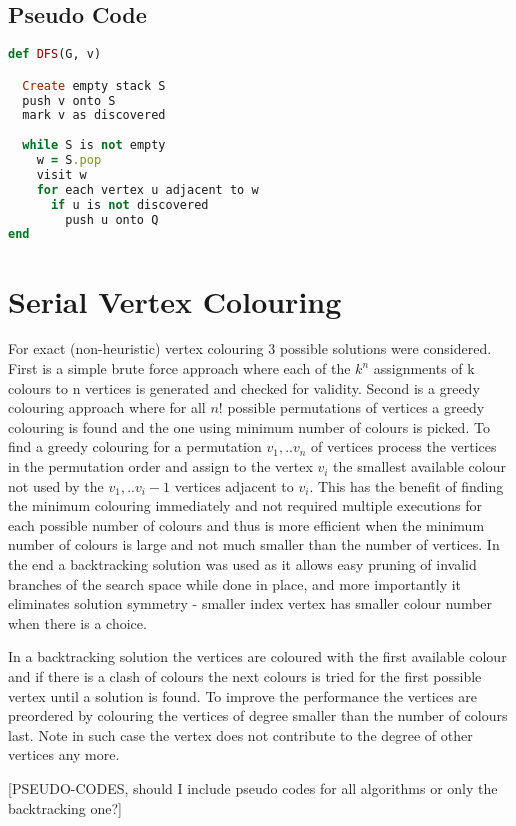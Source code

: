 \documentclass{report}
\theoremstyle{plain}
\theoremstyle{definition}
\theoremstyle{remark}
\begin{document}
\subsection*{Pseudo Code}

\begin{lstlisting}[language=Ruby]
def DFS(G, v)

  Create empty stack S
  push v onto S
  mark v as discovered
  
  while S is not empty
    w = S.pop
    visit w
    for each vertex u adjacent to w
      if u is not discovered
        push u onto Q
end
\end{lstlisting}

\section{Serial Vertex Colouring}

For exact (non-heuristic) vertex colouring 3 possible solutions were considered. First is a simple brute force approach where each of the $k^n$ assignments of k colours to n vertices is generated and checked for validity. Second is a greedy colouring approach where for all $n!$ possible permutations of vertices a greedy colouring is found and the one using minimum number of colours is picked. To find a greedy colouring for a permutation $v_1,..v_n$ of vertices process the vertices in the permutation order and assign to the vertex $v_i$ the smallest available colour not used by the $v_1,..v_i-1$ vertices adjacent to $v_i$. This has the benefit of finding the minimum colouring immediately and not required multiple executions for each possible number of colours and thus is more efficient when the minimum number of colours is large and not much smaller than the number of vertices. In the end a backtracking solution was used as it allows easy pruning of invalid branches of the search space while done in place, and more importantly it eliminates solution symmetry - smaller index vertex has smaller colour number when there is a choice.

In a backtracking solution the vertices are coloured with the first available colour and if there is a clash of colours the next colours is tried for the first possible vertex until a solution is found. To improve the performance the vertices are preordered by colouring the vertices of degree smaller than the number of colours last. Note in such case the vertex does not contribute to the degree of other vertices any more.

[PSEUDO-CODES, should I include pseudo codes for all algorithms or only the backtracking one?]
\end{document}
